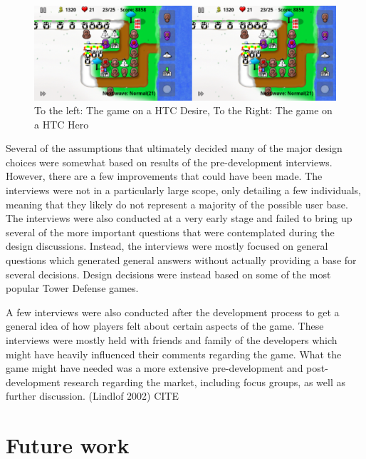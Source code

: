 \begin{figure}[here]

\begin{center}
\includegraphics[scale=0.4]{pics/chapters/chapter5/frankingame}
\end{center}

\caption{To the left: The game on a HTC Desire, To the Right: The game on a HTC Hero}
\label{fig:desirehero}

\end{figure}
Several of the assumptions that ultimately decided many of the major design choices were somewhat based on results of the pre-development interviews. However, there are a few improvements that could have been made. The interviews were not in a particularly large scope, only detailing a few individuals, meaning that they likely do not represent a majority of the possible user base. The interviews were also conducted at a very early stage and failed to bring up several of the more important questions that were contemplated during the design discussions. Instead, the interviews were mostly focused on general questions which generated general answers without actually providing a base for several decisions. Design decisions were instead based on some of the most popular Tower Defense games.

A few interviews were also conducted after the development process to get a general idea of how players felt about certain aspects of the game. These interviews were mostly held with friends and family of the developers which might have heavily influenced their comments regarding the game. What the game might have needed was a more extensive pre-development and post-development research regarding the market, including focus groups, as well as further discussion. (Lindlof 2002) CITE
\section{Future work}

